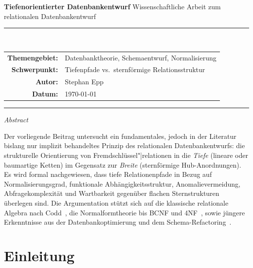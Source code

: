 ﻿\documentclass[12pt,a4paper]{article}
\theoremstyle{definition}
\theoremstyle{remark}
\begin{document}
\begin{titlepage}
  \centering
  \vspace*{2cm}
  {\LARGE\bfseries Tiefenorientierter Datenbankentwurf}
  \vspace{1.5cm}
  {\large Wissenschaftliche Arbeit zum relationalen Datenbankentwurf}
  \vspace{1.5cm}

  \rule{\textwidth}{0.4pt}\\[0.5em]
  \begin{tabular}{rl}
    \textbf{Themengebiet:} & Datenbanktheorie, Schemaentwurf, Normalisierung \\
    \textbf{Schwerpunkt:}  & Tiefenpfade vs.\ sternförmige Relationsstruktur \\
    \textbf{Autor:}        & Stephan Epp \\
    \textbf{Datum:}        & \today \\
  \end{tabular}
  \rule{\textwidth}{0.4pt}

  \vfill
  \textit{Abstract}\\[0.5em]
  \begin{minipage}{0.85\textwidth}
  \small
  Der vorliegende Beitrag untersucht ein fundamentales, jedoch in der Literatur
  bislang nur implizit behandeltes Prinzip des relationalen Datenbankentwurfs:
  die strukturelle Orientierung von Fremdschlüssel"|relationen in die
  \emph{Tiefe} (lineare oder baumartige Ketten) im Gegensatz zur
  \emph{Breite} (sternförmige Hub-Anordnungen). Es wird formal nachgewiesen,
  dass tiefe Relationenpfade in Bezug auf Normalisierungsgrad, funktionale
  Abhängigkeitsstruktur, Anomalievermeidung, Abfragekomplexität und
  Wartbarkeit gegenüber flachen Sternstrukturen überlegen sind. Die Argumentation
  stützt sich auf die klassische relationale Algebra nach Codd~\cite{Codd1970},
  die Normalformtheorie bis BCNF und 4NF~\cite{Codd1974, Fagin1977}, sowie
  jüngere Erkenntnisse aus der Datenbankoptimierung und dem Schema-Refactoring~\cite{Ambler2003}.
  \end{minipage}
\end{titlepage}

\tableofcontents
\newpage

\section{Einleitung}
\label{sec:einleitung}
\end{document}

